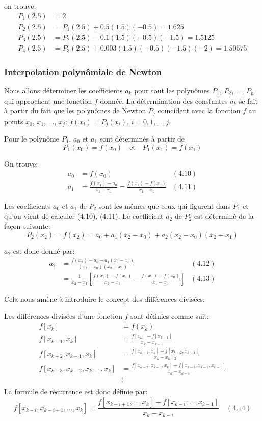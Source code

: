 on trouve: 
\begin{align*}
P_1(2.5) &= 2 \\
P_2(2.5) &= P_1(2.5) + 0.5(1.5)(-0.5) = 1.625 \\
P_3(2.5) &= P_2(2.5) - 0.1(1.5)(-0.5)(-1.5) = 1.5125 \\
P_4(2.5) &= P_3(2.5) + 0.003(1.5)(-0.5)(-1.5)(-2) = 1.50575
\end{align*}

\subsubsection{Interpolation polynômiale de Newton}

Nous allons déterminer les coefficients $a_k$ pour tout les polynômes $P_1$, $P_2$, $\ldots$, $P_n$ qui approchent une fonction $f$ donnée. La détermination des constantes $a_k$ se fait à partir du fait que les polynômes de Newton $P_j$ coïncident avec la fonction $f$ au points $x_0$, $x_1$, $\ldots$, $x_j$: $f(x_i) = P_j(x_i)$, $i = 0, 1, \ldots, j$.

Pour le polynôme $P_1$, $a_0$ et $a_1$ sont déterminés à partir de
\[
P_1(x_0) = f(x_0) \quad \text{et} \quad P_1(x_1) = f(x_1)
\]

On trouve:
\begin{align}
a_0 &= f(x_0) & (4.10) \\
a_1 &= \frac{f(x_1)-a_0}{x_1-x_0} = \frac{f(x_1)-f(x_0)}{x_1-x_0} & (4.11)
\end{align}

Les coefficients $a_0$ et $a_1$ de $P_2$ sont les mêmes que ceux qui figurent dans $P_1$ et qu'on vient de calculer (4.10), (4.11). Le coefficient $a_2$ de $P_2$ est déterminé de la façon suivante:
\[
P_2(x_2) = f(x_2) = a_0 + a_1(x_2-x_0) + a_2(x_2-x_0)(x_2-x_1)
\]

$a_2$ est donc donné par:
\begin{align}
a_2 &= \frac{f(x_2)-a_0-a_1(x_2-x_0)}{(x_2-x_0)(x_2-x_1)} & (4.12) \\
&= \frac{1}{x_2-x_1} \left[ \frac{f(x_2)-f(x_1)}{x_2-x_1} - \frac{f(x_1)-f(x_0)}{x_1-x_0} \right] & (4.13)
\end{align}

Cela nous amène à introduire le concept des différences divisées:

\begin{definition}
	Les différences divisées d'une fonction $f$ sont définies comme suit:
	\begin{align*}
	f[x_k] &= f(x_k) \\
	f[x_{k-1},x_k] &= \frac{f[x_k]-f[x_{k-1}]}{x_k - x_{k-1}} \\
	f[x_{k-2},x_{k-1},x_k] &= \frac{f[x_{k-1},x_k]-f[x_{k-2},x_{k-1}]}{x_k - x_{k-2}} \\
	f[x_{k-3},x_{k-2},x_{k-1},x_k] &= \frac{f[x_{k-2},x_{k-1},x_k]-f[x_{k-3},x_{k-2},x_{k-1}]}{x_k - x_{k-3}} \\
	&\vdots \\
	\end{align*}
	La formule de récurrence est donc définie par:
	\[
	f[x_{k-i},x_{k-i+1},\ldots,x_k] = \frac{f[x_{k-i+1},\ldots,x_k]-f[x_{k-i},\ldots,x_{k-1}]}{x_k - x_{k-i}} \quad (4.14)
	\]
\end{definition}

